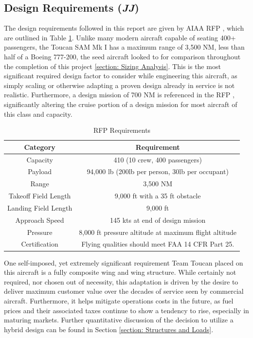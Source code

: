 \subsection{Design Requirements (\textit{JJ})}
The design requirements followed in this report are given by AIAA RFP \cite{RFP}, which are outlined in Table \ref{uno}.  Unlike many modern aircraft capable of seating 400+ passengers, the Toucan SAM Mk I has a maximum range of 3,500 NM, less than half of a Boeing 777-200, the seed aircraft looked to for comparison throughout the completion of this project \ref{section: Sizing Analysis}.  This is the most significant required design factor to consider while engineering this aircraft, as simply scaling or otherwise adapting a proven design already in service is not realistic.  Furthermore, a design mission of 700 NM is referenced in the RFP \cite{RFP}, significantly altering the cruise portion of a design mission for most aircraft of this class and capacity.  

\begin{table}[h!] 
    \centering
    \caption{RFP Requirements}
    \begin{tabular}{ |c||c| }\toprule
    \textbf{Category} & \textbf{Requirement} \\\hline\hline
    Capacity & 410 (10 crew, 400 passengers) \\\hline
    Payload & 94,000 lb (200lb per person, 30lb per occupant) \\\hline
    Range & 3,500 NM \\\hline
    Takeoff Field Length & 9,000 ft with a 35 ft obstacle \\\hline
    Landing Field Length & 9,000 ft \\\hline
    Approach Speed & 145 kts at end of design mission\\\hline
    Pressure & 8,000 ft pressure altitude at maximum flight altitude \\\hline
    Certification & Flying qualities should meet FAA 14 CFR Part 25.\\\hline 

    \end{tabular}\label{uno}
\end{table}

One self-imposed, yet extremely significant requirement Team Toucan placed on this aircraft is a fully composite wing and wing structure. While certainly not required, nor chosen out of necessity, this adaptation is driven by the desire to deliver maximum customer value over the decades of service seen by commercial aircraft.  Furthermore, it helps mitigate operations costs in the future, as fuel prices and their associated taxes continue to show a tendency to rise, especially in maturing markets.  Further quantitative discussion of the decision to utilize a hybrid design can be found in Section \ref{section: Structures and Loads}.

